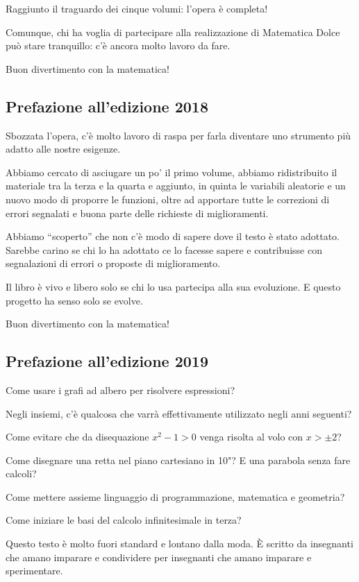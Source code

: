 Raggiunto il traguardo dei cinque volumi: l'opera è completa!

Comunque, chi ha voglia di partecipare alla realizzazione di Matematica Dolce 
può stare tranquillo: 
c'è ancora molto lavoro da fare.

Buon divertimento con la matematica!

\subsection*{Prefazione all'edizione 2018}

Sbozzata l'opera, c'è molto lavoro di raspa per farla diventare uno 
strumento più adatto alle nostre esigenze.

Abbiamo cercato di asciugare un po' il primo volume, abbiamo ridistribuito 
il materiale tra la terza e la quarta e aggiunto, in quinta le variabili 
aleatorie e un nuovo modo di proporre le funzioni,
oltre ad apportare tutte le correzioni di errori segnalati e buona parte 
delle richieste di miglioramenti.

Abbiamo ``scoperto'' che non c'è modo di sapere dove il testo è stato 
adottato. Sarebbe carino se chi lo ha adottato ce lo facesse sapere e 
contribuisse con segnalazioni di errori o proposte di miglioramento.

Il libro è vivo e libero solo se chi lo usa partecipa alla sua evoluzione.
E questo progetto ha senso solo se evolve.

Buon divertimento con la matematica!

\subsection*{Prefazione all'edizione 2019}

Come usare i grafi ad albero per risolvere espressioni?

Negli insiemi, c'è qualcosa che varrà effettivamente utilizzato negli anni 
seguenti? 

Come evitare che da disequazione \(x^2-1>0\) venga risolta al volo con 
\(x>\pm 2\)?

Come disegnare una retta nel piano cartesiano in 10"? E una parabola senza 
fare calcoli?

Come mettere assieme linguaggio di programmazione, matematica e geometria?

Come iniziare le basi del calcolo infinitesimale in terza?

Questo testo è molto fuori standard e lontano dalla moda. È scritto da 
insegnanti che amano imparare e condividere per insegnanti che amano 
imparare e sperimentare.

